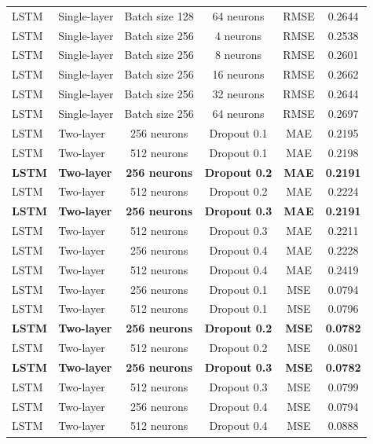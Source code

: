 \begin{landscape}
\begin{longtable}{llcccc}
LSTM & Single-layer & Batch size 128 & 64 neurons & RMSE & 0.2644 \\
LSTM & Single-layer & Batch size 256 & 4 neurons  & RMSE & 0.2538 \\
LSTM & Single-layer & Batch size 256 & 8 neurons  & RMSE & 0.2601 \\
LSTM & Single-layer & Batch size 256 & 16 neurons & RMSE & 0.2662 \\
LSTM & Single-layer & Batch size 256 & 32 neurons & RMSE & 0.2644 \\
LSTM & Single-layer & Batch size 256 & 64 neurons & RMSE & 0.2697 \\


LSTM & Two-layer & 256 neurons & Dropout 0.1 & MAE & 0.2195 \\
LSTM & Two-layer & 512 neurons & Dropout 0.1 & MAE & 0.2198 \\
\textbf{LSTM} & \textbf{Two-layer} & \textbf{256 neurons} & \textbf{Dropout 0.2} & \textbf{MAE} & \textbf{0.2191} \\
LSTM & Two-layer & 512 neurons & Dropout 0.2 & MAE & 0.2224 \\
\textbf{LSTM} & \textbf{Two-layer} & \textbf{256 neurons} & \textbf{Dropout 0.3} & \textbf{MAE} & \textbf{0.2191} \\
LSTM & Two-layer & 512 neurons & Dropout 0.3 & MAE & 0.2211 \\
LSTM & Two-layer & 256 neurons & Dropout 0.4 & MAE & 0.2228 \\
LSTM & Two-layer & 512 neurons & Dropout 0.4 & MAE & 0.2419 \\


LSTM & Two-layer & 256 neurons & Dropout 0.1 & MSE & 0.0794 \\
LSTM & Two-layer & 512 neurons & Dropout 0.1 & MSE & 0.0796 \\
\textbf{LSTM} & \textbf{Two-layer} & \textbf{256 neurons} & \textbf{Dropout 0.2} & \textbf{MSE} & \textbf{0.0782} \\
LSTM & Two-layer & 512 neurons & Dropout 0.2 & MSE & 0.0801 \\
\textbf{LSTM} & \textbf{Two-layer} & \textbf{256 neurons} & \textbf{Dropout 0.3} & \textbf{MSE} & \textbf{0.0782} \\
LSTM & Two-layer & 512 neurons & Dropout 0.3 & MSE & 0.0799 \\
LSTM & Two-layer & 256 neurons & Dropout 0.4 & MSE & 0.0794 \\
LSTM & Two-layer & 512 neurons & Dropout 0.4 & MSE & 0.0888 \\


\end{longtable}
\end{landscape}

